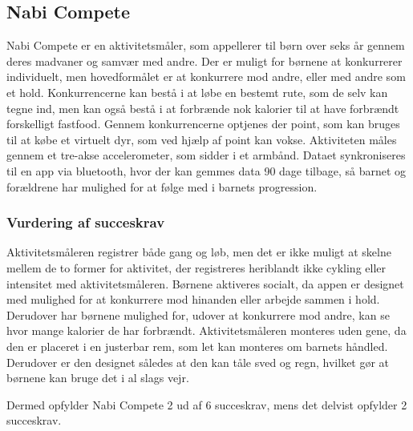 \subsection{Nabi Compete}
Nabi Compete er en aktivitetsmåler, som appellerer til børn over seks år gennem deres madvaner og samvær med andre. Der er muligt for børnene at konkurrerer individuelt, men hovedformålet er at konkurrere mod andre, eller med andre som et hold. Konkurrencerne kan bestå i at løbe en bestemt rute, som de selv kan tegne ind, men kan også bestå i at forbrænde nok kalorier til at have forbrændt forskelligt fastfood. 
Gennem konkurrencerne optjenes der point, som kan bruges til at købe et virtuelt dyr, som ved hjælp af point kan vokse. 
Aktiviteten måles gennem et tre-akse accelerometer, som sidder i et armbånd. Dataet synkroniseres til en app via bluetooth, hvor der kan gemmes data 90 dage tilbage, så barnet og forældrene har mulighed for at følge med i barnets progression. \citep{Fuhu_tech2015,Fuhu2015} 

\subsubsection{Vurdering af succeskrav}
Aktivitetsmåleren registrer både gang og løb, men det er ikke muligt at skelne mellem de to former for aktivitet, der registreres heriblandt ikke cykling eller intensitet med aktivitetsmåleren. 
Børnene aktiveres socialt, da appen er designet med mulighed for at konkurrere mod hinanden eller arbejde sammen i hold. Derudover har børnene mulighed for, 
udover at konkurrere mod andre, kan se hvor mange kalorier de har forbrændt. Aktivitetsmåleren monteres uden gene, da den er placeret i en justerbar rem, som let kan monteres om barnets håndled. Derudover er den designet således at den kan tåle sved og regn, hvilket gør at børnene kan bruge det i al slags vejr. 

Dermed opfylder Nabi Compete 2 ud af 6 succeskrav, mens det delvist opfylder 2 succeskrav.

